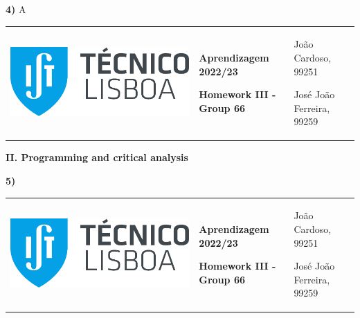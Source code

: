 \documentclass[11pt,a4paper]{article}
\begin{document}
\begin{flushleft}\vspace{2mm}
\textbf{4)}
A
\end{flushleft}

\pagebreak

\color{darkgray}
\hspace{-8.25mm}
\begin{tabularx}{1.09\textwidth} {>{\raggedright\arraybackslash}X >{\centering\arraybackslash}X >{\raggedleft\arraybackslash}X}
  \includegraphics[scale=0.2]{tecnico.pdf} &
  \textbf{Aprendizagem 2022/23} \par \textbf{Homework III - Group 66} &
  João Cardoso, 99251 \par José João Ferreira, 99259
\end{tabularx}
\color{black}

\begin{center}
\textbf{II. Programming and critical analysis}
\end{center}

\begin{flushleft}
\textbf{5)} \par
\begin{center}
\end{center}
\end{flushleft}
\vspace*{2mm}

\pagebreak

\color{darkgray}
\hspace{-8.25mm}
\begin{tabularx}{1.09\textwidth} {>{\raggedright\arraybackslash}X >{\centering\arraybackslash}X >{\raggedleft\arraybackslash}X}
  \includegraphics[scale=0.2]{tecnico.pdf} &
  \textbf{Aprendizagem 2022/23} \par \textbf{Homework III - Group 66} &
  João Cardoso, 99251 \par José João Ferreira, 99259
\end{tabularx}
\color{black}
\end{document}
